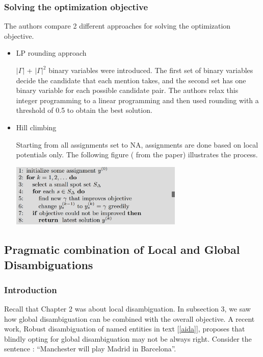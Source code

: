 
  \subsubsection{Solving the optimization objective}
  The authors compare 2 different approaches for solving the optimization objective.
  \begin{itemize}
   \item LP rounding approach\bigskip
   
    $|\Gamma|$ + $|\Gamma|^2$ binary variables were introduced. The first set of binary variables decide the candidate that
   each mention takes, and the second set has one binary variable for each possible candidate pair. 
   The authors relax this integer programming to a linear programming and then used rounding with a threshold of 0.5 to
   obtain the best solution.
   
   \item Hill climbing
   
   Starting from all assignments set to NA, assignments are done based on local potentials only. The following figure (
   from the paper) illustrates the process.
   \begin{center}
    \includegraphics[height = 3cm, scale = 0.25]{hill}
   \end{center}

  \end{itemize}


\subsection{Pragmatic combination of Local and Global Disambiguations}

\subsubsection{Introduction}

Recall that Chapter 2 was about local disambiguation. In subsection 3, we saw how
global disambiguation can be combined with the overall objective. A recent work, 
Robust disambiguation of named entities in text [\ref{aida}], proposes that 
blindly opting for global disambiguation may not be always right. 
Consider the sentence : ``Manchester will play Madrid in Barcelona''.

